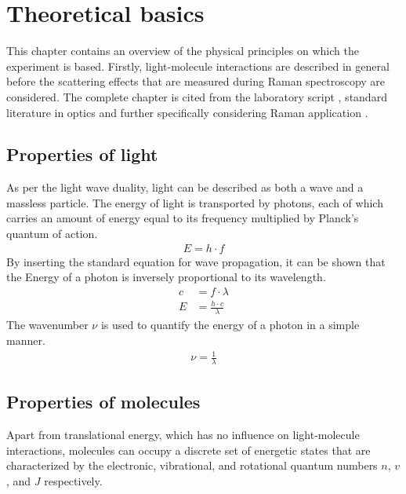 
\chapter{Theoretical basics}
\label{chap:theoretical}

This chapter contains an overview of the physical principles on which the experiment is based. Firstly, light-molecule interactions are described in general before the scattering effects that are measured during Raman spectroscopy are considered. The complete chapter is cited from the laboratory script \autocite{brauerApplicationRamanSpectroscopy2022}, standard literature in optics \autocite{bornPrinciplesOpticsElectromagnetic1999,hechtOptik2005,lipsonOptik1997,niedrigOptikWellenUnd2004} and further specifically considering Raman application \autocite{herzbergMolecularSpectraMolecular2013,schraderInfraredRamanSpectroscopy1995}. 

\section{Properties of light}

As per the light wave duality, light can be described as both a wave and a massless particle. The energy of light is transported by photons, each of which carries an amount of energy equal to its frequency multiplied by Planck’s quantum of action.
\begin{align}
    E=h \cdot f
\end{align}
By inserting the standard equation for wave propagation, it can be shown that the Energy of a photon is inversely proportional to its wavelength.
\begin{align}
    c&=f \cdot \lambda \\
    E&= \frac{h \cdot c}{\lambda}
\end{align}
The wavenumber $\nu$ is used to quantify the energy of a photon in a simple manner.
\begin{align}
    \nu=\frac{1}{\lambda}
\end{align}

\section{Properties of molecules}

Apart from translational energy, which has no influence on light-molecule interactions, molecules can occupy a discrete set of energetic states that are characterized by the electronic, vibrational, and rotational quantum numbers $n$, $v$, and $J$ respectively.


